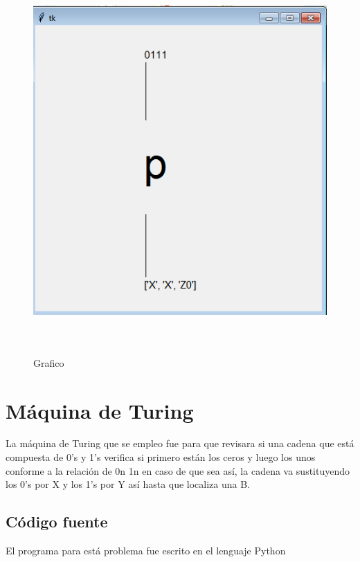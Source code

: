 \documentclass[12pt]{article}
\begin{document}
\begin{figure}[H]
\includegraphics[width=\textwidth, height=14cm]{pila_grafico}
\label{fig:manual_afn}
\caption{Grafico}
\end{figure}

\newpage
\section{Máquina de Turing}
La máquina de Turing que se empleo fue para que revisara si una cadena que está compuesta de 0’s y 1’s verifica si primero están los ceros y luego los unos conforme a la relación de 0n 1n en caso de que sea así, la cadena va sustituyendo los 0’s por X y los 1’s por Y así hasta que localiza una B.
\subsection{Código fuente}
El programa para está problema fue escrito en el lenguaje Python\\
\end{document}
